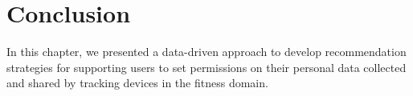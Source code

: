 

\section{Conclusion}
In this chapter, we presented a data-driven approach to develop recommendation strategies for supporting users to set permissions on their personal data collected and shared by tracking devices in the fitness domain.  

